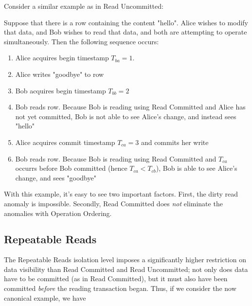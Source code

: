 Consider a similar example as in Read Uncommitted:
\begin{exmp}
				Suppose that there is a row containing the content "hello". Alice wishes to modify that data, and Bob wishes to read that data, and both are attempting to operate simultaneously. Then the following sequence occurs:
				\begin{enumerate}
					\item Alice acquires begin timestamp $T_{ba} = 1$.
					\item Alice writes "goodbye" to row
					\item Bob acquires begin timestamp $T_{bb} = 2$
					\item Bob reads row. Because Bob is reading using Read Committed and Alice has not yet committed, Bob is not able to see Alice's change, and instead sees "hello"
					\item Alice acquires commit timestamp $T_{ca} = 3$ and commits her write	
					\item Bob reads row. Because Bob is reading using Read Committed and $T_{ca}$ occurrs before Bob committed (hence $T_{ca} < T_{cb}$), Bob is able to see Alice's change, and sees "goodbye"
				\end{enumerate}
\end{exmp}
With this example, it's easy to see two important factors. First, the dirty read anomaly is impossible. Secondly, Read Committed does \emph{not} eliminate the anomalies with Operation Ordering.

\subsection{Repeatable Reads}
The Repeatable Reads isolation level imposes a significantly higher restriction on data visibility than Read Committed and Read Uncommitted; not only does data have to be committed (as in Read Committed), but it must also have been committed \emph{before} the reading transaction began. Thus, if we consider the now canonical example, we have


